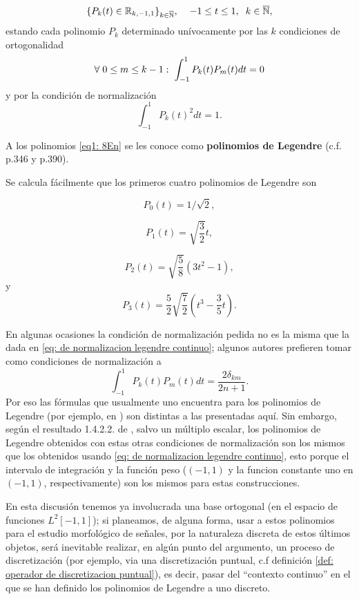 \begin{equation}
\label{eq1: 8En}
\{ P_{k}(t)\in \mathbb{R}_{k, -1,1}\}_{k \in \overline{\mathbb{N}}}, \hspace{0.4cm}
-1 \leq t \leq 1, \hspace{0.2cm}
 k \in \overline{\mathbb{N}},
\end{equation}
estando cada polinomio $P_{k}$ determinado unívocamente
por las $k$ condiciones de ortogonalidad
\[
\forall \hspace{0.1cm} 0 \leq m \leq k-1: \hspace{0.1cm}
\int_{-1}^{1}{P_{k}(t)P_{m}(t)} dt = 0
\]
y por la condición de normalización 
\begin{equation}
	\label{eq: de normalizacion legendre continuo}
	\int_{-1}^{1}{P_{k}(t)^{2}} dt = 1.
\end{equation}


A los polinomios \eqref{eq1: 8En}
se les conoce como \textbf{polinomios de Legendre} 
(c.f. \cite{friedberg} p.346
y \cite{DSML} p.390).


Se calcula fácilmente que los primeros cuatro 
polinomios de Legendre son

\[
P_{0}(t) = 1/\sqrt{2},
\]

\[
P_{1}(t) = \sqrt{\frac{3}{2}}t,
\]

\[
P_{2}(t) = \sqrt{\frac{5}{8}}\left( 3t^{2}-1 \right),
\]
y
\[
P_{3}(t) = \frac{5}{2} \sqrt{\frac{7}{2}}\left( t^{3}- \frac{3}{5}t\right).
\]


\begin{nota}

En algunas ocasiones la condición de normalización
pedida no es la misma que la dada en 
\eqref{eq: de normalizacion legendre continuo};
algunos autores  
prefieren tomar como condiciones de normalización a 
\[
\int_{-1}^{1}{P_{k}(t)P_{m}(t)} dt = \frac{2 \delta_{km}}{2n+1}.
\]
Por eso las fórmulas que usualmente uno encuentra para
los polinomios de Legendre (por ejemplo, en \cite{leg})
son distintas a las presentadas aquí.
Sin embargo, según el resultado 
1.4.2.2. de \cite{libroRusia}, salvo un
múltiplo escalar, los polinomios de Legendre obtenidos
con estas otras condiciones de normalización son los mismos que los 
obtenidos usando \eqref{eq: de normalizacion legendre continuo},
esto porque el intervalo de integración y la función
peso ($(-1,1)$ y la funcion constante uno en $(-1,1)$, respectivamente)
son los mismos para estas construcciones.
\end{nota}


En esta discusión tenemos ya involucrada una base ortogonal
(en el espacio de funciones $L^{2}[-1,1]$);
si planeamos, de alguna forma, usar a estos polinomios
para el estudio morfológico de señales, por la naturaleza
discreta de estos últimos objetos, será
inevitable realizar, en algún punto 
del argumento, un proceso de discretización
(por ejemplo, 
via una discretización
puntual, c.f definición \ref{def: operador de discretizacion puntual}), es decir,
pasar del ``contexto continuo'' en el que se han
definido los polinomios de Legendre a uno discreto. \\

